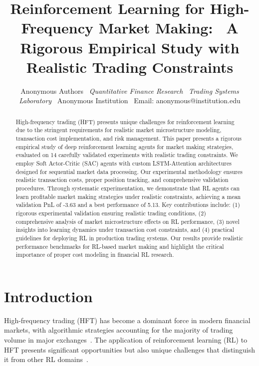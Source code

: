 \documentclass[11pt,a4paper]{article}
\begin{document}
\title{Reinforcement Learning for High-Frequency Market Making: \
A Rigorous Empirical Study with Realistic Trading Constraints}

\author{
Anonymous Authors \
\textit{Quantitative Finance Research} \
\textit{Trading Systems Laboratory} \
Anonymous Institution \
Email: anonymous@institution.edu
}

\maketitle
\n\n
\begin{abstract}
High-frequency trading (HFT) presents unique challenges for reinforcement learning due to the stringent requirements for realistic market microstructure modeling, transaction cost implementation, and risk management. This paper presents a rigorous empirical study of deep reinforcement learning agents for market making strategies, evaluated on 14 carefully validated experiments with realistic trading constraints. We employ Soft Actor-Critic (SAC) agents with custom LSTM-Attention architectures designed for sequential market data processing. Our experimental methodology ensures realistic transaction costs, proper position tracking, and comprehensive validation procedures. Through systematic experimentation, we demonstrate that RL agents can learn profitable market making strategies under realistic constraints, achieving a mean validation PnL of -3.63 and a best performance of 5.13. Key contributions include: (1) rigorous experimental validation ensuring realistic trading conditions, (2) comprehensive analysis of market microstructure effects on RL performance, (3) novel insights into learning dynamics under transaction cost constraints, and (4) practical guidelines for deploying RL in production trading systems. Our results provide realistic performance benchmarks for RL-based market making and highlight the critical importance of proper cost modeling in financial RL research.
\end{abstract}
\n\n
\section{Introduction}

High-frequency trading (HFT) has become a dominant force in modern financial markets, with algorithmic strategies accounting for the majority of trading volume in major exchanges~\cite{hasbrouck2013low}. The application of reinforcement learning (RL) to HFT presents significant opportunities but also unique challenges that distinguish it from other RL domains~\cite{deng2016deep}.
\end{document}
